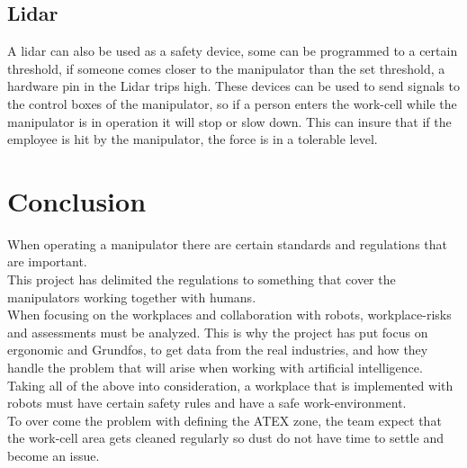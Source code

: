 \subsection{Lidar}
A lidar can also be used as a safety device\cite{Lidar}, some can be programmed to a certain threshold, if someone comes closer to the manipulator than the set threshold, a hardware pin in the Lidar trips high. These devices can be used to send signals to the control boxes of the manipulator, so if a person enters the work-cell while the manipulator is in operation it will stop or slow down. This can insure that if the employee is hit by the manipulator, the force is in a tolerable level.\\

\section{Conclusion}

When operating a manipulator there are certain standards and regulations that are important.\\
This project has delimited the regulations to something that cover the manipulators working together with humans.\\
When focusing on the workplaces and collaboration with robots, workplace-risks and assessments must be analyzed. This is why the project has put focus on ergonomic and Grundfos, to get data from the real industries, and how they handle the problem that will arise when working with artificial intelligence.\\
Taking all of the above into consideration, a workplace that is implemented with robots must have certain safety rules and have a safe work-environment.\\
To over come the problem with defining the ATEX zone, the team expect that the work-cell area gets cleaned regularly so dust do not have time to settle and become an issue.\\